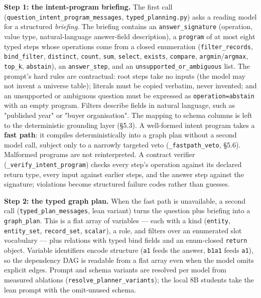 \textbf{Step 1: the intent-program briefing.} The first call (\texttt{question\_intent\_program\_messages}, \texttt{typed\_planning.py}) asks a reading model for a structured \emph{briefing}. The briefing contains an \texttt{answer\_signature} (operation, value type, natural-language answer-field description), a \texttt{program} of at most eight typed steps whose operations come from a closed enumeration (\texttt{filter\_records}, \texttt{bind\_filter}, \texttt{distinct}, \texttt{count}, \texttt{sum}, \texttt{select}, \texttt{exists}, \texttt{compare}, \texttt{argmin}/\texttt{argmax}, \texttt{top\_k}, \texttt{abstain}), an \texttt{answer\_step}, and an \texttt{unsupported\_or\_ambiguous} list. The prompt's hard rules are contractual: root steps take no inputs (the model may not invent a universe table); literals must be copied verbatim, never invented; and an unsupported or ambiguous question must be expressed as \texttt{operation=abstain} with an empty program. Filters describe fields in natural language, such as "published year" or "buyer organisation". The mapping to schema columns is left to the deterministic grounding layer (§5.3). A well-formed intent program takes a \textbf{fast path}: it compiles deterministically into a graph plan without a second model call, subject only to a narrowly targeted veto (\texttt{\_fastpath\_veto}, §5.6). Malformed programs are not reinterpreted. A contract verifier (\texttt{\_verify\_intent\_program}) checks every step's operation against its declared return type, every input against earlier steps, and the answer step against the signature; violations become structured failure codes rather than guesses.

\textbf{Step 2: the typed graph plan.} When the fast path is unavailable, a second call (\texttt{typed\_plan\_messages}, lean variant) turns the question plus briefing into a \texttt{graph\_plan}. This is a flat array of variables --- each with a kind (\texttt{entity}, \texttt{entity\_set}, \texttt{record\_set}, \texttt{scalar}), a role, and filters over an enumerated slot vocabulary --- plus relations with typed bind fields and an enum-closed \texttt{return} object. Variable identifiers encode structure (\texttt{a1} feeds the answer, \texttt{b1a1} feeds \texttt{a1}), so the dependency DAG is readable from a flat array even when the model omits explicit edges. Prompt and schema variants are resolved per model from measured ablations (\texttt{resolve\_planner\_variants}); the local 8B students take the lean prompt with the omit-unused schema.

